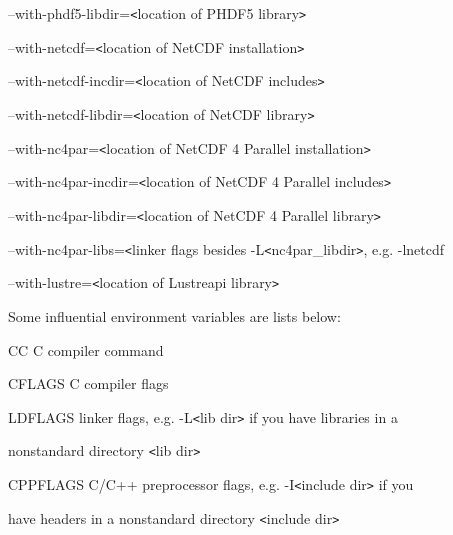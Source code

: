 \vspace{10pt}
--with-phdf5-libdir=\texttt{<}location of PHDF5 library\texttt{>}

\vspace{10pt}
--with-netcdf=\texttt{<}location of NetCDF installation\texttt{>}

\vspace{10pt}
\parindent=14pt
--with-netcdf-incdir=\texttt{<}location of NetCDF includes\texttt{>}

\vspace{10pt}
\parindent=7pt
--with-netcdf-libdir=\texttt{<}location of NetCDF library\texttt{>}

\vspace{10pt}
\parindent=0pt
--with-nc4par=\texttt{<}location of NetCDF 4 Parallel installation\texttt{>}

\vspace{10pt}
\parindent=7pt
--with-nc4par-incdir=\texttt{<}location of NetCDF 4 Parallel includes\texttt{>}

\vspace{10pt}
--with-nc4par-libdir=\texttt{<}location of NetCDF 4 Parallel library\texttt{>}

\vspace{10pt}
\parindent=14pt
--with-nc4par-libs=\texttt{<}linker flags besides -L\texttt{<}nc4par\_libdir\texttt{>}, 
e.g. -lnetcdf

\vspace{10pt}
\parindent=0pt
--with-lustre=\texttt{<}location of Lustreapi library\texttt{>}

\vspace{34pt}
Some influential environment variables are lists below:

\vspace{10pt}
\parindent=7pt
CC        C compiler command

\vspace{10pt}
CFLAGS    C compiler flags

\vspace{10pt}
\parindent=14pt
LDFLAGS   linker flags, e.g. -L\texttt{<}lib dir\texttt{>} if you have libraries 
in a

\vspace{10pt}
\parindent=43pt
nonstandard directory \texttt{<}lib dir\texttt{>}

\vspace{10pt}
\parindent=7pt
CPPFLAGS  C/C++ preprocessor flags, e.g. -I\texttt{<}include dir\texttt{>} if you

\vspace{10pt}
\parindent=43pt
have headers in a nonstandard directory \texttt{<}include dir\texttt{>}

